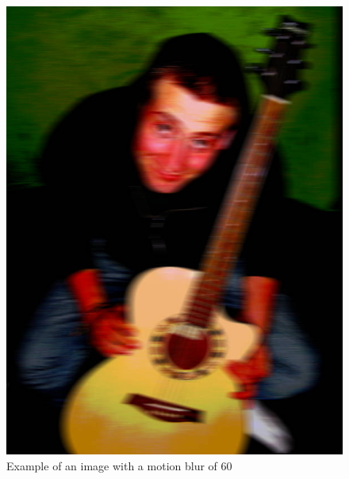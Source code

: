 \begin{itemize}
\begin{figure}[ht]
\begin{minipage}[b]{0.47\linewidth}
\includegraphics[width=\textwidth]{Motion.jpg}
\end{minipage}
\caption{Example of an image with a motion blur of 60}
\end{figure}

\end{itemize}

